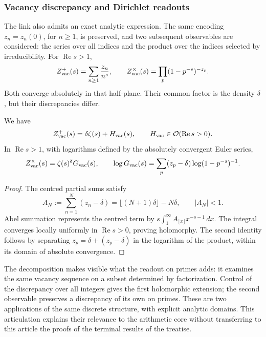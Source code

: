 \subsubsection{Vacancy discrepancy and Dirichlet readouts}

The link also admits an exact analytic expression. The same
encoding \(z_n=z_n(0)\), for \(n\geq1\), is preserved, and
two subsequent observables are considered: the series over all indices and the
product over the indices selected by irreducibility. For
\(\operatorname{Re}s>1\),
\[
 Z_{\rm vac}^{+}(s)=\sum_{n\geq1}\frac{z_n}{n^s},\qquad
 Z_{\rm vac}^{\times}(s)=\prod_p(1-p^{-s})^{-z_p}.
\]
Both converge absolutely in that half-plane. Their common factor is the
density \(\delta\), but their discrepancies differ.

\begin{proposition}
We have
\[
 Z_{\rm vac}^{+}(s)=\delta\zeta(s)+H_{\rm vac}(s),
 \qquad H_{\rm vac}\in\mathcal O(\operatorname{Re}s>0).
\]
In \(\operatorname{Re}s>1\), with logarithms defined by the absolutely
convergent Euler series,
\[
 Z_{\rm vac}^{\times}(s)=\zeta(s)^\delta G_{\rm vac}(s),\qquad
 \log G_{\rm vac}(s)=
 \sum_p(z_p-\delta)\log(1-p^{-s})^{-1}.
\]
\end{proposition}
\begin{proof}
The centred partial sums satisfy
\[
 A_N:=\sum_{n=1}^N(z_n-\delta)
 =\lfloor(N+1)\delta\rfloor-N\delta,\qquad |A_N|<1.
\]
Abel summation represents the centred term by
\(s\int_1^\infty A_{\lfloor x\rfloor}x^{-s-1}\,dx\). The integral
converges locally uniformly in \(\operatorname{Re}s>0\),
proving holomorphy. The second identity follows by separating
\(z_p=\delta+(z_p-\delta)\) in the logarithm of the product, within
its domain of absolute convergence.
\end{proof}

The decomposition makes visible what the readout on primes adds: it examines
the same vacancy sequence on a subset determined by
factorization. Control of the discrepancy over all integers gives
the first holomorphic extension; the second observable preserves a
discrepancy of its own on primes. These are two applications of the same
discrete structure, with explicit analytic domains. This articulation
explains their relevance to the arithmetic core without transferring to this
article the proofs of the terminal results of the treatise.


